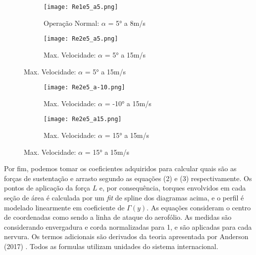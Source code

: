 \documentclass[a4paper]{article}
\begin{document}
\begin{figure}[H]
    \begin{subfigure}[b]{0.48\textwidth}
      \texttt{[image: Re1e5\_a5.png]}
      \caption*{Operação Normal: $\alpha$ = 5° a 8m/s}
    \end{subfigure}
    \begin{subfigure}[b]{0.48\textwidth}
      \texttt{[image: Re2e5\_a5.png]}
      \caption*{Max. Velocidade: $\alpha$ = 5° a 15m/s}
    \end{subfigure}
\end{figure}

\begin{figure}[H]
    \begin{subfigure}[b]{0.48\textwidth}
      \texttt{[image: Re2e5\_a-10.png]}
      \caption*{Max. Velocidade: $\alpha$ = -10° a 15m/s}
    \end{subfigure}
    \begin{subfigure}[b]{0.48\textwidth}
      \texttt{[image: Re2e5\_a15.png]}
      \caption*{Max. Velocidade: $\alpha$ = 15° a 15m/s}
    \end{subfigure}
\end{figure}


Por fim, podemos tomar os coeficientes adquiridos para calcular quais são as forças de sustentação e arrasto segundo as equações (2) e (3) respectivamente. Os pontos de aplicação da força $L$ e, por consequência, torques envolvidos em cada seção de área é calculada por um \textit{fit} de spline dos diagramas acima, e o perfil é modelado linearmente em coeficiente de $\Gamma(y)$. As equações consideram o centro de coordenadas como sendo a linha de ataque do aerofólio. As medidas são considerando envergadura e corda normalizadas para 1, e são aplicadas para cada nervura. Os termos adicionais são derivados da teoria apresentada por Anderson (2017) \cite{anderson}. Todos as formulas utilizam unidades do sistema internacional.

\vspace{0.5cm}
\end{document}
